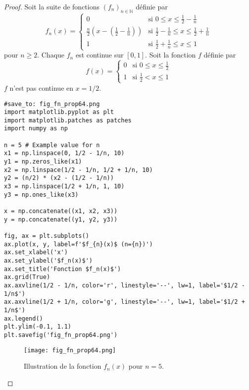 \documentclass{article}
\newcommand{\N}{\mathbb{N}}
\begin{document}
\begin{proof}
Soit la suite de fonctions $(f_n)_{n \in \N}$ définie par
\[
f_n(x) =
\begin{cases}
0 & \text{si } 0 \leq x \leq \frac{1}{2} - \frac{1}{n} \\
\frac{n}{2} (x - (\frac{1}{2} - \frac{1}{n})) & \text{si } \frac{1}{2} - \frac{1}{n} \leq x \leq \frac{1}{2} + \frac{1}{n} \\
1 & \text{si } \frac{1}{2} + \frac{1}{n} \leq x \leq 1
\end{cases}
\]
pour $n \geq 2$. Chaque $f_n$ est continue sur $[0, 1]$.
Soit la fonction $f$ définie par
\[
f(x) =
\begin{cases}
0 & \text{si } 0 \leq x \leq \frac{1}{2} \\
1 & \text{si } \frac{1}{2} < x \leq 1
\end{cases}
\]
$f$ n'est pas continue en $x=1/2$.

\begin{verbatim}
#save_to: fig_fn_prop64.png
import matplotlib.pyplot as plt
import matplotlib.patches as patches
import numpy as np

n = 5 # Example value for n
x1 = np.linspace(0, 1/2 - 1/n, 10)
y1 = np.zeros_like(x1)
x2 = np.linspace(1/2 - 1/n, 1/2 + 1/n, 10)
y2 = (n/2) * (x2 - (1/2 - 1/n))
x3 = np.linspace(1/2 + 1/n, 1, 10)
y3 = np.ones_like(x3)

x = np.concatenate((x1, x2, x3))
y = np.concatenate((y1, y2, y3))

fig, ax = plt.subplots()
ax.plot(x, y, label=f'$f_{n}(x)$ (n={n})')
ax.set_xlabel('x')
ax.set_ylabel('$f_n(x)$')
ax.set_title('Fonction $f_n(x)$')
ax.grid(True)
ax.axvline(1/2 - 1/n, color='r', linestyle='--', lw=1, label='$1/2 - 1/n$')
ax.axvline(1/2 + 1/n, color='g', linestyle='--', lw=1, label='$1/2 + 1/n$')
ax.legend()
plt.ylim(-0.1, 1.1)
plt.savefig('fig_fn_prop64.png')
\end{verbatim}

\begin{figure}[H]
    \centering
    \texttt{[image: fig\_fn\_prop64.png]}
    \caption{Illustration de la fonction $f_n(x)$ pour $n=5$.}
    \label{fig:fn_prop64}
\end{figure}


\end{proof}
\end{document}
